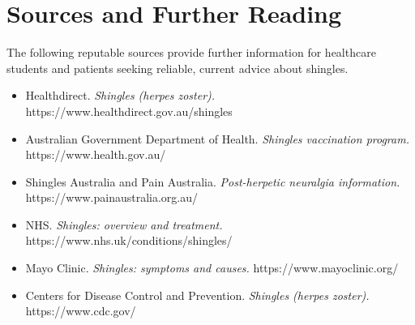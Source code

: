 \section*{Sources and Further Reading}
The following reputable sources provide further information for healthcare students and patients seeking reliable, current advice about shingles.

\begin{itemize}
    \item Healthdirect. \textit{Shingles (herpes zoster).} https://www.healthdirect.gov.au/shingles
    \item Australian Government Department of Health. \textit{Shingles vaccination program.} https://www.health.gov.au/
    \item Shingles Australia and Pain Australia. \textit{Post-herpetic neuralgia information.} https://www.painaustralia.org.au/
    \item NHS. \textit{Shingles: overview and treatment.} https://www.nhs.uk/conditions/shingles/
    \item Mayo Clinic. \textit{Shingles: symptoms and causes.} https://www.mayoclinic.org/
    \item Centers for Disease Control and Prevention. \textit{Shingles (herpes zoster).} https://www.cdc.gov/
\end{itemize}
